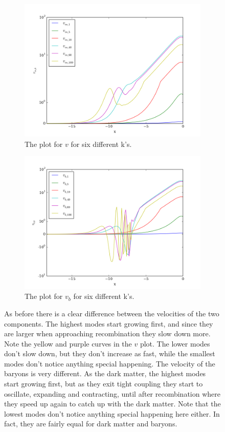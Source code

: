 \documentclass[a4paper]{report}
\begin{document}
\begin{figure}[ht]
\begin{subfigure}{.5\textwidth}
  \includegraphics[width=\textwidth]{v.png}
 \caption{The plot for $v$ for six different k's.}
 \label{fig:v}
\end{subfigure}
\begin{subfigure}{.5\textwidth}
\includegraphics[width=\textwidth]{vb.png}
 \caption{The plot for $v_b$ for six different k's.}
 \label{fig:vb}
\end{subfigure}
\caption{As before there is a clear difference between the velocities of the two components. The highest modes start growing first, and since they are larger when approaching recombination they slow down more. Note the yellow and purple curves in the $v$ plot. The lower modes don't slow down, but they don't increase as fast, while the smallest modes don't notice anything special happening. The velocity of the baryons is very different. As the dark matter, the highest modes start growing first, but as they exit tight coupling they start to oscillate, expanding and contracting, until after recombination where they speed up again to catch up with the dark matter. Note that the lowest modes don't notice anything special happening here either. In fact, they are fairly equal for dark matter and baryons.}
\end{figure}
\end{document}
